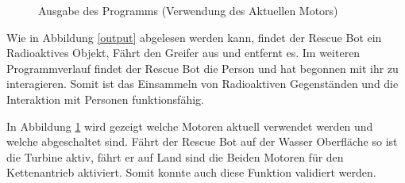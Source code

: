 \begin{figure}[H]
  \caption{Ausgabe des Programms (Verwendung des Aktuellen Motors)}
  \label{waterr}
\end{figure}

Wie in Abbildung \ref{output} abgelesen werden kann, findet der Rescue Bot ein Radioaktives Objekt, Fährt den Greifer aus und entfernt es. Im weiteren Programmverlauf findet der Rescue Bot die Person und hat begonnen mit ihr zu interagieren. Somit ist das Einsammeln von Radioaktiven Gegenständen und die Interaktion mit Personen funktionsfähig. 

In Abbildung \ref{waterr} wird gezeigt welche Motoren aktuell verwendet werden und welche abgeschaltet sind. Fährt der Rescue Bot auf der Wasser Oberfläche so ist die Turbine aktiv, fährt er auf Land sind die Beiden Motoren für den Kettenantrieb aktiviert. Somit konnte auch diese Funktion validiert werden.